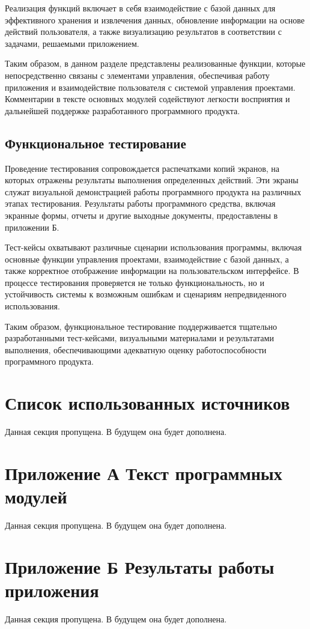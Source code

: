 \documentclass[12pt,a4paper,draft]{belgost/belgost}
\begin{document}
Реализация функций включает в себя взаимодействие с базой данных для эффективного хранения и извлечения данных, обновление информации на основе действий пользователя, а также визуализацию результатов в соответствии с задачами, решаемыми приложением.

Таким образом, в данном разделе представлены реализованные функции, которые непосредственно связаны с элементами управления, обеспечивая работу приложения и взаимодействие пользователя с системой управления проектами.
Комментарии в тексте основных модулей содействуют легкости восприятия и дальнейшей поддержке разработанного программного продукта.

\section{Функциональное тестирование}

Проведение тестирования сопровождается распечатками копий экранов, на которых отражены результаты выполнения определенных действий.
Эти экраны служат визуальной демонстрацией работы программного продукта на различных этапах тестирования.
Результаты работы программного средства, включая экранные формы, отчеты и другие выходные документы, предоставлены в приложении Б.

Тест-кейсы охватывают различные сценарии использования программы, включая основные функции управления проектами, взаимодействие с базой данных, а также корректное отображение информации на пользовательском интерфейсе.
В процессе тестирования проверяется не только функциональность, но и устойчивость системы к возможным ошибкам и сценариям непредвиденного использования.

Таким образом, функциональное тестирование поддерживается тщательно разработанными тест-кейсами, визуальными материалами и результатами выполнения, обеспечивающими адекватную оценку работоспособности программного продукта.

\chapter*{Список использованных источников}

Данная секция пропущена.
В будущем она будет дополнена.

\chapter*{Приложение А Текст программных модулей}

Данная секция пропущена.
В будущем она будет дополнена.

\chapter*{Приложение Б Результаты работы приложения}

Данная секция пропущена.
В будущем она будет дополнена.
\end{document}
